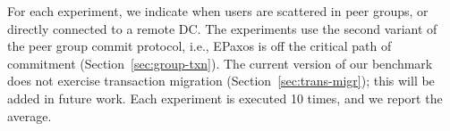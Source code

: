 For each experiment, 
we indicate when users are scattered in peer groups, 
or directly connected to a remote DC.
%
The experiments use the second variant of
the peer group commit protocol, i.e., EPaxos is off the critical path of
commitment (Section~\ref{sec:group-txn}).
%
The current version of our benchmark does not exercise transaction migration 
(Section~\ref{sec:trans-migr});
this will be added in future work.
%
Each experiment is executed 10 times, 
and we report the average.
